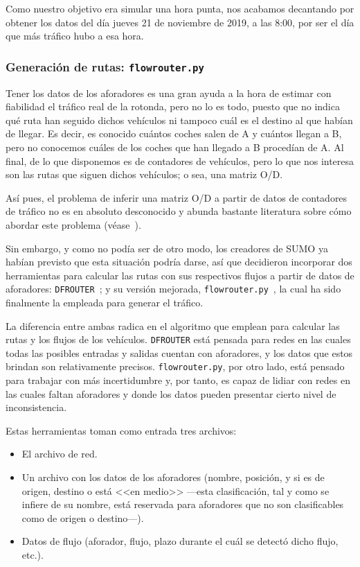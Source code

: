 Como nuestro objetivo era simular una hora punta, nos acabamos decantando por obtener los datos del día jueves 21 de noviembre de 2019, a las 8:00, por ser el día que más tráfico hubo a esa hora.

\subsubsection{Generación de rutas: \texttt{flowrouter.py}}

Tener los datos de los aforadores es una gran ayuda a la hora de estimar con fiabilidad el tráfico real de la rotonda, pero no lo es todo, puesto que no indica qué ruta han seguido dichos vehículos ni tampoco cuál es el destino al que habían de llegar. Es decir, es conocido cuántos coches salen de A y cuántos llegan a B, pero no conocemos cuáles de los coches que han llegado a B procedían de A. Al final, de lo que disponemos es de contadores de vehículos, pero lo que nos interesa son las rutas que siguen dichos vehículos; o sea, una matriz O/D.

Así pues, el problema de inferir una matriz O/D a partir de datos de contadores de tráfico no es en absoluto desconocido y abunda bastante literatura sobre cómo abordar este problema (véase~\cite{otto_anker_nielsen_two_1998}). 

Sin embargo, y como no podía ser de otro modo, los creadores de SUMO ya habían previsto que esta situación podría darse, así que decidieron incorporar dos herramientas para calcular las rutas con sus respectivos flujos a partir de datos de aforadores: \texttt{DFROUTER}~\cite{noauthor_dfrouter_nodate}; y su versión mejorada, \texttt{flowrouter.py}~\cite{noauthor_flowrouterpy_nodate,behrisch_route_2018}, la cual ha sido finalmente la empleada para generar el tráfico.

La diferencia entre ambas radica en el algoritmo que emplean para calcular las rutas y los flujos de los vehículos. \texttt{DFROUTER} está pensada para redes en las cuales todas las posibles entradas y salidas cuentan con aforadores, y los datos que estos brindan son relativamente precisos. \texttt{flowrouter.py}, por otro lado, está pensado para trabajar con más incertidumbre y, por tanto, es capaz de lidiar con redes en las cuales faltan aforadores y donde los datos pueden presentar cierto nivel de inconsistencia.

Estas herramientas toman como entrada tres archivos:

\begin{itemize}
    \item El archivo de red.
    \item Un archivo con los datos de los aforadores (nombre, posición, y si es de origen, destino o está <<en medio>> ---esta clasificación, tal y como se infiere de su nombre, está reservada para aforadores que no son clasificables como de origen o destino---).
    \item Datos de flujo (aforador, flujo, plazo durante el cuál se detectó dicho flujo, etc.).
\end{itemize}

